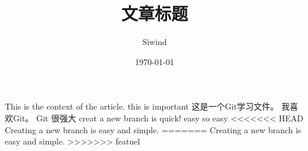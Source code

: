 \documentclass[UTF8]{ctexart}
\title{文章标题}
\author{Siwind}
\date{\today}
\begin{document}
    \maketitle
    This is the context of the article.
    this is important
    这是一个Git学习文件。
    我喜欢Git。
    Git 很强大
    creat a new branch is quick!
    easy
    so easy
<<<<<<< HEAD
    Creating a new branch is easy and simple.
=======
    Creating a new branch is easy and simple.
>>>>>>> featuel
    
\end{document}
